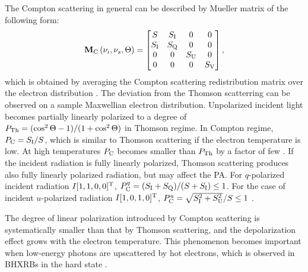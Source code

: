 The Compton scattering in general can be described by Mueller matrix of the following form:
\begin{equation}
    \mathbf{M}_{\mathrm{C}}\left(\nu_i, \nu_s, \Theta\right) = 
    \begin{bmatrix}
        S & S_{\mathrm{I}} & 0 & 0 \\
        S_{\mathrm{I}} & S_{\mathrm{Q}} & 0 & 0 \\
        0 & 0 & S_{\mathrm{U}} & 0 \\
        0 & 0 & 0 & S_{\mathrm{V}} \\
    \end{bmatrix},
\end{equation}
which is obtained by averaging the Compton scattering redistribution matrix over the electron distribution \citep{Nagirner1993}.
The deviation from the Thomson scatterring can be observed on a sample Maxwellian electron distribution.
Unpolarized incident light becomes partially linearly polarized to a degree of $P_{\mathrm{Th}} = (\cos^2\Theta - 1) / (1 + \cos^2\Theta)$ in Thomson regime.
In Compton regime, $P_{\mathrm{C}} = S_{\mathrm{I}} / S$, which is similar to Thomson scattering if the electron temperature is low. 
At high temperatures $P_{\mathrm{C}}$ becomes smaller than $P_{\mathrm{Th}}$ by a factor of few \citep[dependening on the scattering angle $\Theta$ and ratio of $\nu_i/\nu_s$, see ][]{Poutanen1993}.
If the incident radiation is fully linearly polarized, Thomson scattering produces also fully linearly polarized radiation, but may affect the \gls{PA}.
For $q$-polarized incident radiation $I[1, 1, 0, 0]^{\mathrm{T}}$, $P_{\mathrm{C}}^q = (S_{\mathrm{I}} + S_{\mathrm{Q}}) / (S + S_{\mathrm{I}}) \le 1$.
For the case of incident $u$-polarized radiation $I[1, 0, 1, 0]^{\mathrm{T}}$, $P_{\mathrm{C}}^u = \sqrt{S_{\mathrm{I}}^2 + S_{\mathrm{U}}^2} / S \le 1$ \citep[see also][]{Poutanen1993a}.

The degree of linear polarization introduced by Compton scattering is systematically smaller than that by Thomson scattering, and the depolarization effect grows with the electron temperature.
This phenomenon becomes important when low-energy photons are upscattered by hot electrons, which is observed in \glspl{BHXRB} in the hard state \citep{Zdziarski2004a,Poutanen2014a}.


